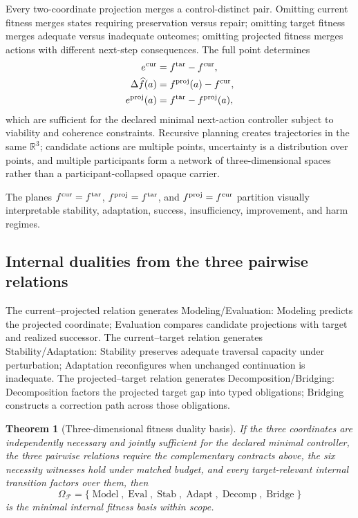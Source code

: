 \documentclass[11pt]{article}
\newtheorem{theorem}{Theorem}
\newcommand{\F}{\mathcal{F}}
\newcommand{\Model}{\operatorname{Model}}
\newcommand{\Eval}{\operatorname{Eval}}
\newcommand{\Stab}{\operatorname{Stab}}
\newcommand{\Adapt}{\operatorname{Adapt}}
\newcommand{\Decomp}{\operatorname{Decomp}}
\newcommand{\Bridge}{\operatorname{Bridge}}
\begin{document}
Every two-coordinate projection merges a control-distinct pair. Omitting current fitness merges states requiring preservation versus repair; omitting target fitness merges adequate versus inadequate outcomes; omitting projected fitness merges actions with different next-step consequences. The full point determines
\begin{align}
e^{\rm cur}&=f^{\rm tar}-f^{\rm cur},\\
\Delta\widehat f(a)&=f^{\rm proj}(a)-f^{\rm cur},\\
e^{\rm proj}(a)&=f^{\rm tar}-f^{\rm proj}(a),
\end{align}
which are sufficient for the declared minimal next-action controller subject to viability and coherence constraints. Recursive planning creates trajectories in the same $\mathbb R^3$; candidate actions are multiple points, uncertainty is a distribution over points, and multiple participants form a network of three-dimensional spaces rather than a participant-collapsed opaque carrier.

The planes $f^{\rm cur}=f^{\rm tar}$, $f^{\rm proj}=f^{\rm tar}$, and $f^{\rm proj}=f^{\rm cur}$ partition visually interpretable stability, adaptation, success, insufficiency, improvement, and harm regimes.

\subsection{Internal dualities from the three pairwise relations}

The current--projected relation generates Modeling/Evaluation: Modeling predicts the projected coordinate; Evaluation compares candidate projections with target and realized successor. The current--target relation generates Stability/Adaptation: Stability preserves adequate traversal capacity under perturbation; Adaptation reconfigures when unchanged continuation is inadequate. The projected--target relation generates Decomposition/Bridging: Decomposition factors the projected target gap into typed obligations; Bridging constructs a correction path across those obligations.

\begin{theorem}[Three-dimensional fitness duality basis]
If the three coordinates are independently necessary and jointly sufficient for the declared minimal controller, the three pairwise relations require the complementary contracts above, the six necessity witnesses hold under matched budget, and every target-relevant internal transition factors over them, then
\begin{equation}
\boxed{\Omega_{\F}=\{\Model,\Eval,\Stab,\Adapt,\Decomp,\Bridge\}}
\end{equation}
is the minimal internal fitness basis within scope.
\end{theorem}
\end{document}
